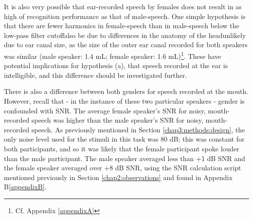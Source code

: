 It is also very possible that ear-recorded speech by females does not result in as high of recognition performance as that of male-speech.  One simple hypothesis is that there are fewer harmonics in female-speech than in male-speech below the low-pass filter cutoff\DIFdelbegin {}\DIFdelend \DIFaddbegin {}\DIFaddend also be due to differences in the anatomy of the head\DIFdelbegin {}\DIFdelend \DIFaddbegin {}\DIFaddend unlikely due to ear canal size, as the size of the outer ear canal recorded for both speakers was \DIFdelbegin {}\DIFdelend \DIFaddbegin {}\DIFaddend similar (male speaker: 1.4 mL; female speaker: 1.6 mL)\footnote{Cf. Appendix \ref{appendixA}}.  These have potential implications for hypothesis (a), that speech recorded at the ear is intelligible, and this difference should be investigated further.
%
%

There is also a difference between both genders for speech recorded at the mouth.
However, recall that - in the instance of these two particular speakers - gender is confounded with SNR.  The average female speaker's SNR for noisy, mouth-recorded speech was higher than the male speaker's SNR for noisy, mouth-recorded speech.  As previously mentioned in Section \ref{chap3:methods:design}, the only noise level used for the stimuli in this task was 80 dB; this was constant for both participants, and so it was likely that the female participant spoke louder than the male participant.  The male speaker averaged less than +1 dB SNR and the female speaker averaged over +8 dB SNR, using the SNR calculation script mentioned previously in Section \ref{chap2:observations} and found in Appendix B\ref{appendixB}.

